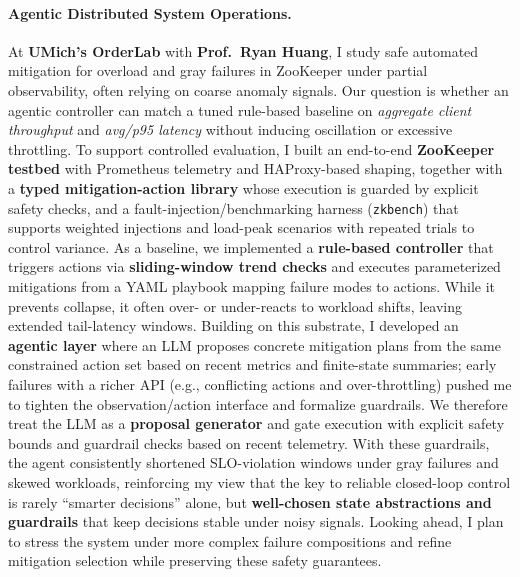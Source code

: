 \documentclass{article}
\begin{document}
\paragraph{Agentic Distributed System Operations.}
At \textbf{UMich's OrderLab} with \textbf{Prof.~Ryan Huang}, I study safe automated mitigation for overload and gray failures in ZooKeeper under partial observability, often relying on coarse anomaly signals.
Our question is whether an agentic controller can match a tuned rule-based baseline on \emph{aggregate client throughput} and \emph{avg/p95 latency} without inducing oscillation or excessive throttling.
To support controlled evaluation, I built an end-to-end \textbf{ZooKeeper testbed} with Prometheus telemetry and HAProxy-based shaping, together with a \textbf{typed mitigation-action library} whose execution is guarded by explicit safety checks, and a fault-injection/benchmarking harness (\texttt{zkbench}) that supports weighted injections and load-peak scenarios with repeated trials to control variance.
As a baseline, we implemented a \textbf{rule-based controller} that triggers actions via \textbf{sliding-window trend checks} and executes parameterized mitigations from a YAML playbook mapping failure modes to actions. While it prevents collapse, it often over- or under-reacts to workload shifts, leaving extended tail-latency windows.
Building on this substrate, I developed an \textbf{agentic layer} where an LLM proposes concrete mitigation plans from the same constrained action set based on recent metrics and finite-state summaries; early failures with a richer API (e.g., conflicting actions and over-throttling) pushed me to tighten the observation/action interface and formalize guardrails.
We therefore treat the LLM as a \textbf{proposal generator} and gate execution with explicit safety bounds and guardrail checks based on recent telemetry.
With these guardrails, the agent consistently shortened SLO-violation windows under gray failures and skewed workloads, reinforcing my view that the key to reliable closed-loop control is rarely ``smarter decisions'' alone, but \textbf{well-chosen state abstractions and guardrails} that keep decisions stable under noisy signals. Looking ahead, I plan to stress the system under more complex failure compositions and refine mitigation selection while preserving these safety guarantees.
\end{document}
